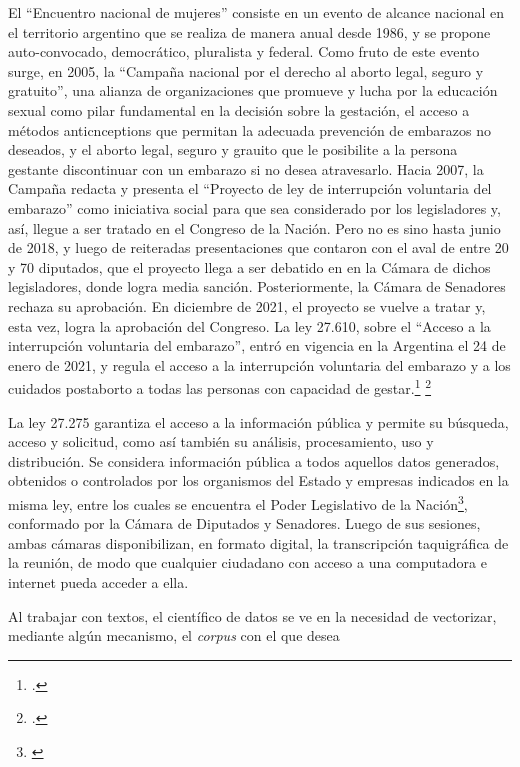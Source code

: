 El ``Encuentro nacional de mujeres'' consiste en un evento de alcance nacional
en el territorio argentino que se realiza de manera anual desde 1986, y se propone
auto-convocado, democrático, pluralista y federal.
Como fruto de este evento surge, en 2005, la ``Campaña nacional por el derecho al
aborto legal, seguro y gratuito'', una alianza de organizaciones que promueve y
lucha por la educación sexual como pilar fundamental en la decisión sobre la gestación,
el acceso a métodos anticnceptions que permitan la adecuada prevención de embarazos
no deseados, y el aborto legal, seguro y grauito que le posibilite a la persona gestante
discontinuar con un embarazo si no desea atravesarlo.
Hacia 2007, la Campaña redacta y presenta el ``Proyecto de ley de interrupción
voluntaria del embarazo'' como iniciativa social para que sea considerado por los
legisladores y, así, llegue a ser tratado en el Congreso de la Nación.
Pero no es sino hasta junio de 2018, y luego de reiteradas presentaciones que contaron
con el aval de entre 20 y 70 diputados, que el proyecto llega a ser debatido en en la
Cámara de dichos legisladores, donde logra media sanción.
Posteriormente, la Cámara de Senadores rechaza su aprobación.
En diciembre de 2021, el proyecto se vuelve a tratar y, esta vez, logra la aprobación
del Congreso.
La ley 27.610, sobre el ``Acceso a la interrupción voluntaria del embarazo'', entró
en vigencia en la Argentina el 24 de enero de 2021, y regula el acceso a la
interrupción voluntaria del embarazo y a los cuidados postaborto a todas
las personas con capacidad de gestar.\footnote{\citeauthor{campana@lalucha}.}
\footnote{\citeauthor{huesped@historia}.}
\par
La ley 27.275 garantiza el acceso a la información pública y permite su búsqueda,
acceso y solicitud, como así también su análisis, procesamiento, uso y distribución.
Se considera información pública a todos aquellos datos generados, obtenidos o
controlados por los organismos del Estado y empresas indicados en la misma ley, entre
los cuales se encuentra el Poder Legislativo de la
Nación\footnote{\citeauthor{minjusticia@accesoinfo}}, conformado por la Cámara
de Diputados y Senadores.
Luego de sus sesiones, ambas cámaras disponibilizan, en formato digital, la
transcripción taquigráfica de la reunión, de modo que cualquier ciudadano con
acceso a una computadora e internet pueda acceder a ella.
\par
Al trabajar con textos, el científico de datos se ve en la necesidad
de vectorizar, mediante algún mecanismo, el \textit{corpus} con el que desea
